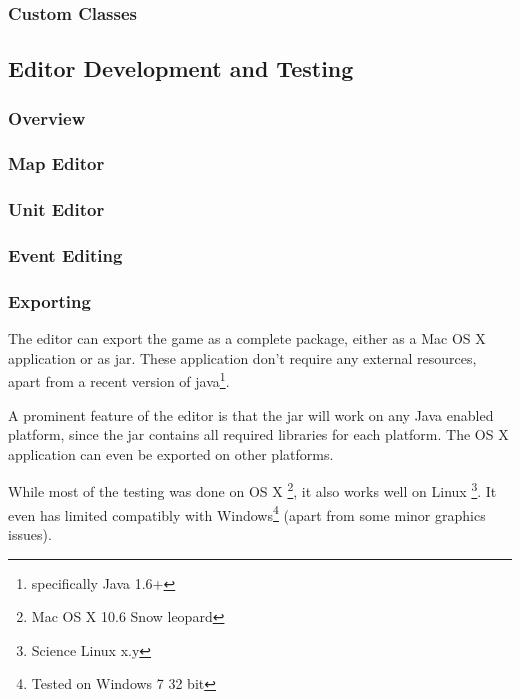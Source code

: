 \subsubsection{Custom Classes} %
\label{ssub:custom_classes}


\subsection{Editor Development and Testing}

\subsubsection{Overview}
\label{ssub:overview}

\subsubsection{Map Editor}
\label{ssub:map_editor}

\subsubsection{Unit Editor}
\label{ssub:unit_editors}

\subsubsection{Event Editing}

\subsubsection{Exporting}
\label{ssub:exporting}

The editor can export the game as a complete package, either as a Mac OS X application or as jar. These application don't require any external resources, apart from a recent version of java\footnote{specifically Java 1.6+}.

A prominent feature of the editor is that the jar will work on any Java enabled platform, since the jar contains all required libraries for each platform. The OS X application can even be exported on other platforms.

While most of the testing was done on OS X \footnote{Mac OS X 10.6 Snow leopard}, it also works well on Linux \footnote{Science  Linux x.y}. It even has limited compatibly with Windows\footnote{Tested on Windows 7 32 bit} (apart from some minor graphics issues).
